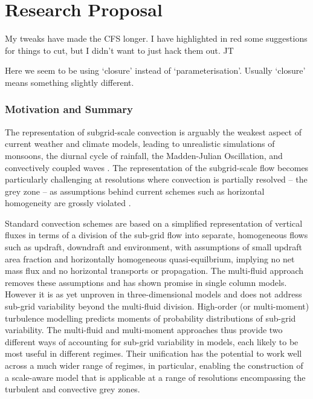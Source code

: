 \documentclass[11pt,a4paper]{article}
\begin{document}


\newpage

\part{Research Proposal}

{\color{red} My tweaks have made the CFS longer. I have highlighted in red some suggestions for things
to cut, but I didn't want to just hack them out. JT}

{\color{red} Here we seem to be using `closure' instead of `parameterisation'. Usually `closure' means something
slightly different.}




\section{Motivation and Summary}

The representation of subgrid-scale convection is arguably the weakest aspect of current weather and climate models, leading to unrealistic simulations of monsoons, the diurnal cycle of rainfall, the Madden-Julian Oscillation, and convectively coupled waves  \cite[]{SAB+13,HPB+14}. The representation of the subgrid-scale flow becomes particularly challenging at resolutions where convection is partially resolved -- the grey zone -- as assumptions behind current schemes such as horizontal homogeneity are grossly violated \cite[e.g.][]{GG05}.

Standard convection schemes are based on a simplified %
representation of vertical fluxes in terms of a division of the sub-grid flow into separate, homogeneous flows such as updraft, downdraft and environment, with assumptions of small updraft area fraction and horizontally homogeneous quasi-equilbrium, implying no net mass flux and no horizontal transports or propagation. The multi-fluid approach removes these assumptions and has shown promise in single column models. However it is as yet unproven in three-dimensional models and does not address sub-grid variability beyond the multi-fluid division. High-order (or multi-moment) turbulence modelling predicts moments of probability distributions of sub-grid variability. The multi-fluid and multi-moment approaches thus provide two different ways of accounting for sub-grid variability in models, each likely to be most useful in different regimes. Their unification has the potential to work well across a much wider range of regimes, in particular, enabling the construction of a scale-aware model that is applicable at a range of resolutions encompassing the turbulent and convective grey zones.
\end{document}
